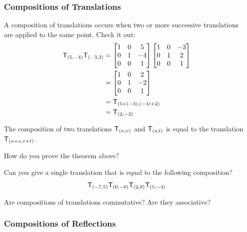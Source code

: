 \subsubsection{Compositions of Translations}

A composition of translations occurs when two or more successive
translations are applied to the same point. Check it out:
\begin{align*}
\mathsf{T}_{(5,-4)}\mathsf{T}_{(-3,2)} &= \begin{bmatrix}
1 & 0 &  5\\
0 & 1 & -4\\
0 & 0 &  1
\end{bmatrix}
\begin{bmatrix}
1 & 0 & -3\\
0 & 1 &  2\\
0 & 0 &  1
\end{bmatrix}\\
&=\begin{bmatrix}
1 & 0 &  2\\
0 & 1 & -2\\
0 & 0 &  1
\end{bmatrix}\\
&=\mathsf{T}_{(5+(-3),(-4)+2)}\\
&=\mathsf{T}_{(2,-2)}
\end{align*}

\begin{theorem}
The composition of two translations $\mathsf{T}_{(u,v)}$ and
$\mathsf{T}_{(s,t)}$ is equal to the translation $\mathsf{T}_{(u+s,v+t)}$.
\end{theorem}

\begin{question} How do you prove the theorem above?
\end{question}
\QM

\begin{question}
Can you give a single translation that is equal to the following composition?
\[
\mathsf{T}_{(-7,5)}\mathsf{T}_{(0,-6)}\mathsf{T}_{(2,8)}\mathsf{T}_{(5,-4)}
\]
\end{question}
\QM

\begin{question}
Are compositions of translations commutative?  Are they
associative?
\end{question}
\QM


\subsubsection{Compositions of Reflections}

